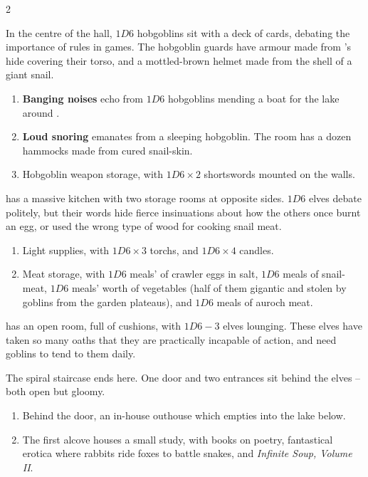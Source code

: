\begin{multicols}{2}
\begin{description}
  In the centre of the hall, $1D6$ hobgoblins sit with a deck of cards, debating the importance of rules in games.
  The hobgoblin guards have \gls{armour} made from 's hide \gls{covering} their torso, and a mottled-brown helmet made from the shell of a giant snail.
  \begin{enumerate}
    \item
    \textbf{Banging noises} echo from $1D6$ hobgoblins mending a boat for the lake around .
    \item
    \textbf{Loud snoring} emanates from a sleeping hobgoblin.
    The room has a dozen hammocks made from cured snail-skin.
    \item
    Hobgoblin weapon storage, with $1D6 \times 2$ shortswords mounted on the walls.
    \label{towerWeaponStorage}
  \end{enumerate}
  \item[The first floor]\label{towerKitchen}
  has a massive kitchen with two storage rooms at opposite sides.
  $1D6$ elves debate politely, but their words hide fierce insinuations about how the others once burnt an egg, or used the wrong type of wood for cooking snail meat.
  \begin{minipage}{\linewidth}
    \begin{enumerate}
      \item
      Light supplies, with $1D6 \times 3$ \glspl{torch}, and $1D6 \times 4$ candles.
      \item
      Meat storage, with $1D6$ meals' of \gls{crawler} eggs in salt, $1D6$ meals of snail-meat, $1D6$ meals' worth of vegetables (half of them gigantic and stolen by goblins from the garden plateaus), and $1D6$ meals of auroch meat.
    \end{enumerate}
  \end{minipage}
  \item[The second floor]
  has an open room, full of cushions, with $1D6-3$ elves lounging.
  These elves have taken so many oaths that they are practically incapable of action, and need goblins to tend to them daily.

  The spiral staircase ends here.
  One door and two entrances sit behind the elves -- both open but gloomy.
  \begin{enumerate}
    \item
    Behind the door, an in-house outhouse which empties into the lake below.
    \item
    The first alcove houses a small study, with books on poetry, fantastical erotica where rabbits ride foxes to battle snakes,
    and \textit{Infinite Soup, Volume II}.


\end{enumerate}
\end{description}
\end{multicols}
